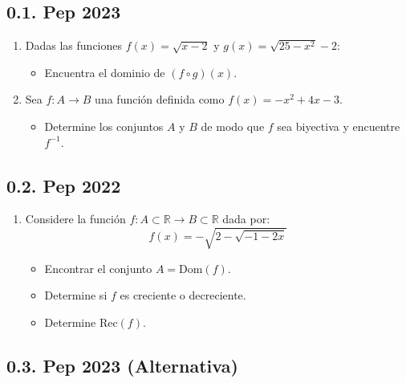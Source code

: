 \documentclass[letterpaper, 12pt]{article}
\begin{document}
\subsection*{0.1. Pep 2023}

\begin{enumerate}
    \item[\textbf{1.0)}] Dadas las funciones $f(x)=\sqrt{x-2}$ y $g(x)=\sqrt{25-x^{2}}-2$:
    \begin{itemize}
        \item Encuentra el dominio de $(f\circ g)(x)$.
    \end{itemize}

    \item[\textbf{1.1)}] Sea $f:A\rightarrow B$ una función definida como $f(x)=-x^{2}+4x-3$.
    \begin{itemize}
        \item Determine los conjuntos $A$ y $B$ de modo que $f$ sea biyectiva y encuentre $f^{-1}$.
    \end{itemize}
\end{enumerate}

\subsection*{0.2. Pep 2022}

\begin{enumerate}
    \item[\textbf{1.3)}] Considere la función $f:A\subset\mathbb{R}\rightarrow B\subset\mathbb{R}$ dada por:
    \[
    f(x) = -\sqrt{2-\sqrt{-1-2x}}
    \]
    \begin{itemize}
        \item[\textbf{a)}] Encontrar el conjunto $A=\text{Dom}(f)$.
        \item[\textbf{b)}] Determine si $f$ es creciente o decreciente.
        \item[\textbf{c)}] Determine $\text{Rec}(f)$.
    \end{itemize}
\end{enumerate}

\subsection*{0.3. Pep 2023 (Alternativa)}
\end{document}
